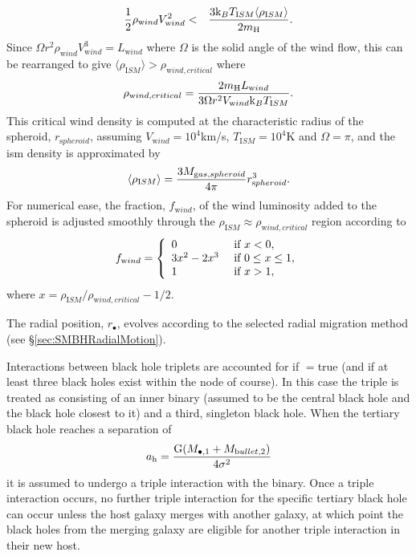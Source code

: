 \begin{description}
\begin{eqnarray}
 \frac{1}{2}\rho_{\mathrm wind} V_{\mathrm wind}^2 &<& {3 {\mathrm k_B} T_{\mathrm ISM} \langle \rho_{\mathrm ISM}\rangle \over 2 m_{\mathrm H}}.
\end{eqnarray}
Since $\Omega r^2 \rho_{\mathrm wind} V_{\mathrm wind}^3 = L_{\mathrm wind}$ where $\Omega$ is the solid angle of the wind flow, this can be rearranged to give $\langle\rho_{\mathrm ISM}\rangle > \rho_{\mathrm wind, critical}$ where
\begin{equation}
\rho_{\mathrm wind,critical} = {2 m_{\mathrm H} L_{\mathrm wind} \over 3 \Omega r^2 V_{\mathrm wind} {\mathrm k_B} T_{\mathrm ISM}}.
\end{equation}
This critical wind density is computed at the characteristic radius of the spheroid, $r_{\mathrm spheroid}$, assuming $V_{\mathrm wind}=10^4$km/s, $T_{\mathrm ISM}=10^4$K and $\Omega=\pi$, and the \gls{ism} density is approximated by
\begin{equation}
 \langle\rho_{\mathrm ISM}\rangle = {3 M_{\mathrm gas, spheroid} \over 4 \pi} r_{\mathrm spheroid}^3.
\end{equation}
For numerical ease, the fraction, $f_{\mathrm wind}$, of the wind luminosity added to the spheroid is adjusted smoothly through the $\rho_{\mathrm ISM}\approx\rho_{\mathrm wind,critical}$ region according to
\begin{equation}
 f_{\mathrm wind} = \left\{ \begin{array}{ll} 0 & \hbox{ if } x < 0, \\ 3x^2-2x^3 & \hbox{ if } 0 \le x \le 1, \\ 1 & \hbox{ if } x > 1, \end{array} \right.
\end{equation}
where $x=\rho_{\mathrm ISM}/\rho_{\mathrm wind,critical}-1/2$.
\end{description}

The radial position, $r_\bullet$, evolves according to the selected radial migration method (see \S\ref{sec:SMBHRadialMotion}).

Interactions between black hole triplets are accounted for if {\normalfont \ttfamily [tripleBlackHoleInteraction]}$=${\normalfont \ttfamily true} (and if at least three black holes exist within the \gls{node} of course). In this case the triple is treated as consisting of an inner binary (assumed to be the central black hole and the black hole closest to it) and a third, singleton black hole. When the tertiary black hole reaches a separation of 
\begin{equation}
a_{\mathrm h}= {{\mathrm G} (M_{\bullet, 1} + M_{\mathrm bullet, 2}) \over 4 \sigma^2}
\end{equation}
it is assumed to undergo a triple interaction with the binary. Once a triple interaction occurs, no further triple interaction for the specific tertiary black hole can occur unless the host galaxy merges with another galaxy, at which point the black holes from the merging galaxy are eligible for another triple interaction in their new host.

